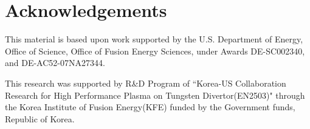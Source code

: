 \section*{Acknowledgements}

This material is based upon work supported by the U.S. Department of Energy, Office of Science, Office of Fusion Energy Sciences,
under Awards 
DE-SC002340, %
and
DE-AC52-07NA27344.  %

This research was supported by R\&D Program of ``Korea-US Collaboration Research for High Performance Plasma on Tungsten Divertor(EN2503)" through the Korea Institute of Fusion Energy(KFE) funded by the Government funds, Republic of Korea.
